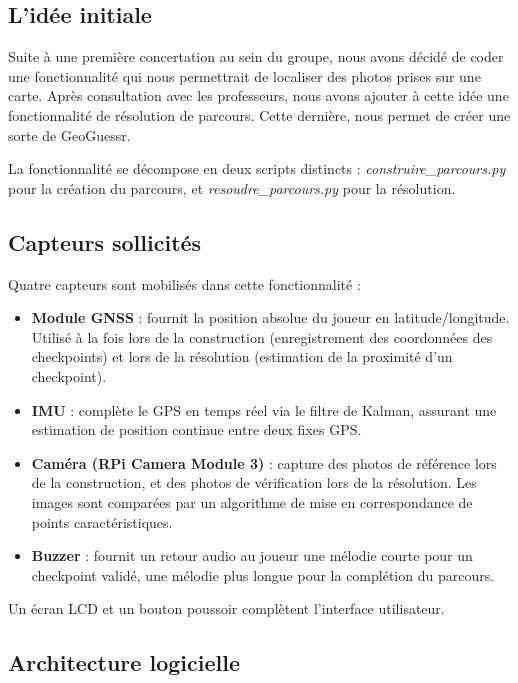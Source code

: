 \subsection{L'idée initiale}
Suite à une première concertation au sein du groupe, nous avons décidé de coder une fonctionnalité qui nous permettrait de localiser des photos prises sur une carte. Après consultation avec les professeurs, nous avons ajouter à cette idée une fonctionnalité de résolution de parcours. Cette dernière, nous permet de créer une sorte de GeoGuessr. 

La fonctionnalité se décompose en deux scripts distincts :
\textit{construire\_parcours.py} pour la création du parcours, et
\textit{resoudre\_parcours.py} pour la résolution.

\subsection{Capteurs sollicités}

Quatre capteurs sont mobilisés dans cette fonctionnalité :

\begin{itemize}
    \item \textbf{Module GNSS} : fournit la position absolue du joueur en
    latitude/longitude. Utilisé à la fois lors de la construction (enregistrement
    des coordonnées des checkpoints) et lors de la résolution (estimation de
    la proximité d'un checkpoint).
    \item \textbf{IMU} : complète le GPS en temps réel via le filtre de Kalman,
    assurant une estimation de position continue entre deux fixes GPS.
    \item \textbf{Caméra (RPi Camera Module 3)} : capture des photos de
    référence lors de la construction, et des photos de vérification lors de
    la résolution. Les images sont comparées par un algorithme de mise en
    correspondance de points caractéristiques.
    \item \textbf{Buzzer} : fournit un retour audio au joueur une mélodie
    courte pour un checkpoint validé, une mélodie plus longue pour la
    complétion du parcours.
\end{itemize}

Un écran LCD et un bouton poussoir complètent l'interface utilisateur.

\subsection{Architecture logicielle}

